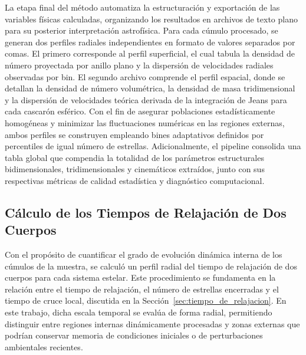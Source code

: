         La etapa final del método automatiza la estructuración y exportación de 
        las variables físicas calculadas, organizando los resultados en archivos 
        de texto plano para su posterior interpretación astrofísica. Para cada 
        cúmulo procesado, se generan dos perfiles radiales independientes en 
        formato de valores separados por comas. El primero corresponde al perfil 
        superficial, el cual tabula la densidad de número proyectada por anillo 
        plano y la dispersión de velocidades radiales observadas por bin. El 
        segundo archivo comprende el perfil espacial, donde se detallan la 
        densidad de número volumétrica, la densidad de masa tridimensional y la 
        dispersión de velocidades teórica derivada de la integración de Jeans 
        para cada cascarón esférico. Con el fin de asegurar poblaciones 
        estadísticamente homogéneas y minimizar las fluctuaciones numéricas en 
        las regiones externas, ambos perfiles se construyen empleando bines 
        adaptativos definidos por percentiles de igual número de estrellas. 
        Adicionalmente, el pipeline consolida una tabla global que compendia la 
        totalidad de los parámetros estructurales bidimensionales, 
        tridimensionales y cinemáticos extraídos, junto con sus respectivas 
        métricas de calidad estadística y diagnóstico computacional.

    \subsection{Cálculo de los Tiempos de Relajación de Dos Cuerpos}
    \label{sec:cal_tiempo_relajacion}

        Con el propósito de cuantificar el grado de evolución dinámica interna 
        de los cúmulos de la muestra, se calculó un perfil radial del tiempo de 
        relajación de dos cuerpos para cada sistema estelar. Este procedimiento 
        se fundamenta en la relación entre el tiempo de relajación, el número de 
        estrellas encerradas y el tiempo de cruce local, discutida en la 
        Sección~\ref{sec:tiempo_de_relajacion}. En este trabajo, dicha escala 
        temporal se evalúa de forma radial, permitiendo distinguir entre 
        regiones internas dinámicamente procesadas y zonas externas que podrían 
        conservar memoria de condiciones iniciales o de perturbaciones 
        ambientales recientes.

